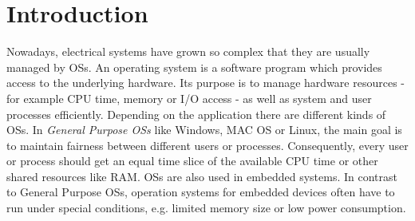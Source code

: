 \chapter{Introduction}
Nowadays, electrical systems have grown so complex that they are usually managed by \acp{OS}. 
An operating system is a software program which provides access to the underlying hardware. 
Its purpose is to manage hardware resources - for example \ac{CPU} time, memory or \ac{I/O} access - as well as system and user processes efficiently. 
Depending on the application there are different kinds of \acp{OS}. 
In \textit{General Purpose \acp{OS}} like Windows, \ac{MAC} OS or Linux, the main goal is to maintain fairness between different users or processes. 
Consequently, every user or process should get an equal time slice of the available \ac{CPU} time or other shared resources like \ac{RAM}. 
\acp{OS} are also used in embedded systems. 
In contrast to General Purpose \acp{OS}, operation systems for embedded devices often have to run under special conditions, e.g. limited memory size or low power consumption. 



